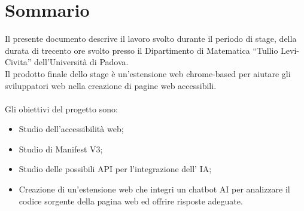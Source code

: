 \cleardoublepage
{}
{}
\begingroup
\let\clearpage\relax
\let\cleardoublepage\relax
\chapter*{Sommario}

Il presente documento descrive il lavoro svolto durante il periodo di stage, della durata di trecento ore svolto presso il Dipartimento di Matematica “Tullio Levi-Civita” dell’Università di Padova. \\
Il prodotto finale dello stage è un'estensione web chrome-based per aiutare gli sviluppatori web nella creazione di pagine web accessibili.\\
\\
Gli obiettivi del progetto sono:
\begin{itemize}
    \item Studio dell'accessibilità web;
    \item Studio di Manifest V3;
    \item Studio delle possibili API per l'integrazione dell' IA;
    \item Creazione di un'estensione web che integri un chatbot AI per analizzare il codice sorgente della pagina web ed offrire risposte adeguate.
\end{itemize}

\endgroup
\vfill